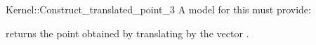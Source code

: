 \begin{ccRefFunctionObjectConcept}{Kernel::Construct_translated_point_3}
A model for this must provide:


       {returns the point obtained by translating  by the vector 
        .}

\ccIsModel{}

\end{ccRefFunctionObjectConcept}
